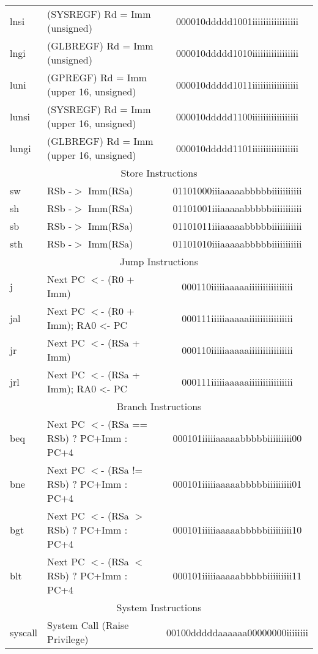 \documentclass[letterpaper, 11pt]{article}
\begin{document}
\begin{center}
\begin{longtable}{|l|l|c|}
			lnsi		& (SYSREGF) Rd = Imm (unsigned)					& 000010ddddd1001iiiiiiiiiiiiiiiii \\
			lngi		& (GLBREGF) Rd = Imm (unsigned)					& 000010ddddd1010iiiiiiiiiiiiiiiii \\
			luni		& (GPREGF) Rd = Imm	 (upper 16, unsigned)		& 000010ddddd1011iiiiiiiiiiiiiiiii \\
			lunsi		& (SYSREGF) Rd = Imm (upper 16, unsigned)		& 000010ddddd1100iiiiiiiiiiiiiiiii \\
			lungi		& (GLBREGF) Rd = Imm	(upper 16, unsigned)		& 000010ddddd1101iiiiiiiiiiiiiiiii \\
			\hline
			\multicolumn{3}{|c|}{Store Instructions} \\ \hline

			sw			& RSb -$>$ Imm(RSa)								& 01101000iiiaaaaabbbbbiiiiiiiiiii\\
			sh			& RSb -$>$ Imm(RSa)								& 01101001iiiaaaaabbbbbiiiiiiiiiii\\
			sb			& RSb -$>$ Imm(RSa)								& 01101011iiiaaaaabbbbbiiiiiiiiiii\\
			sth			& RSb -$>$ Imm(RSa)								& 01101010iiiaaaaabbbbbiiiiiiiiiii\\
			\hline
			\multicolumn{3}{|c|}{Jump Instructions} \\ \hline		
			j			& Next PC $<$- (R0 + Imm)						& 000110iiiiiaaaaaiiiiiiiiiiiiiiii\\
			jal			& Next PC $<$- (R0 + Imm); RA0 <- PC 			& 000111iiiiiaaaaaiiiiiiiiiiiiiiii\\
			jr			& Next PC $<$- (RSa + Imm)						& 000110iiiiiaaaaaiiiiiiiiiiiiiiii\\
			jrl			& Next PC $<$- (RSa + Imm); RA0 <- PC			& 000111iiiiiaaaaaiiiiiiiiiiiiiiii\\
			\hline
			\multicolumn{3}{|c|}{Branch Instructions} \\ \hline
			beq			& Next PC $<$- (RSa == RSb) ? PC+Imm : PC+4		& 000101iiiiiaaaaabbbbbiiiiiiiii00\\
			bne			& Next PC $<$- (RSa != RSb) ? PC+Imm : PC+4		& 000101iiiiiaaaaabbbbbiiiiiiiii01\\
			bgt			& Next PC $<$- (RSa $>$ RSb) ? PC+Imm : PC+4	& 000101iiiiiaaaaabbbbbiiiiiiiii10\\
			blt			& Next PC $<$- (RSa $<$ RSb) ? PC+Imm : PC+4	& 000101iiiiiaaaaabbbbbiiiiiiiii11\\
			\hline
			\multicolumn{3}{|c|}{System Instructions} \\ \hline
			syscall		& System Call (Raise Privilege)					& 00100dddddaaaaaa00000000iiiiiiii\\

\end{longtable}
\end{center}
\end{document}
